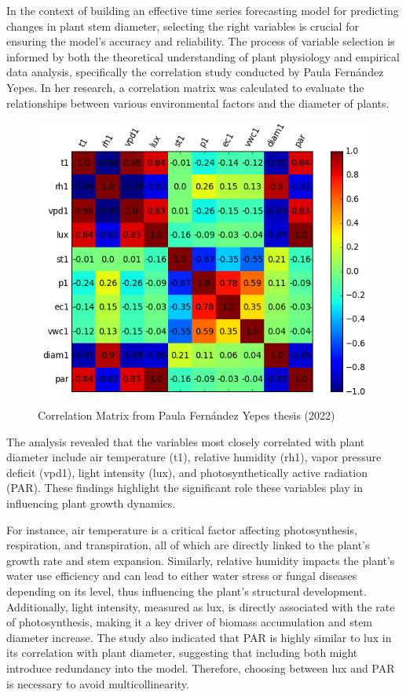 In the context of building an effective time series forecasting model for predicting changes in plant stem diameter, selecting the right variables is crucial for ensuring the model's accuracy and reliability. The process of variable selection is informed by both the theoretical understanding of plant physiology and empirical data analysis, specifically the correlation study conducted by Paula Fernández Yepes. In her research, a correlation matrix was calculated to evaluate the relationships between various environmental factors and the diameter of plants.

\begin{figure}[htbp]
    \centering
    \includegraphics[width=10 cm]{4_ChapterMaterials/figuras/Correlation_matrix.png}
    \caption{Correlation Matrix from Paula Fernández Yepes thesis (2022)\cite{FernandezYepes2022}}
    \end{figure}

The analysis revealed that the variables most closely correlated with plant diameter include air temperature (t1), relative humidity (rh1), vapor pressure deficit (vpd1), light intensity (lux), and photosynthetically active radiation (PAR). These findings highlight the significant role these variables play in influencing plant growth dynamics.

For instance, air temperature is a critical factor affecting photosynthesis, respiration, and transpiration, all of which are directly linked to the plant's growth rate and stem expansion. Similarly, relative humidity impacts the plant's water use efficiency and can lead to either water stress or fungal diseases depending on its level, thus influencing the plant's structural development. Additionally, light intensity, measured as lux, is directly associated with the rate of photosynthesis, making it a key driver of biomass accumulation and stem diameter increase. The study also indicated that PAR is highly similar to lux in its correlation with plant diameter, suggesting that including both might introduce redundancy into the model. Therefore, choosing between lux and PAR is necessary to avoid multicollinearity.

